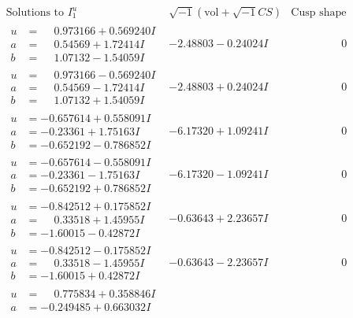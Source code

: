 \documentclass[1p]{elsarticle_modified}
\theoremstyle{definition}
\newcommand{\I}{\sqrt{-1}}
\begin{document}
$$\begin{array}{c|c|c}
\text{Solutions to }I^u_{1}& \I (\text{vol} + \sqrt{-1}CS) & \text{Cusp shape}\\
 \hline 
\begin{aligned}
u &= \phantom{-}0.973166 + 0.569240 I \\
a &= \phantom{-}0.54569 + 1.72414 I \\
b &= \phantom{-}1.07132 - 1.54059 I\end{aligned}
 & -2.48803 - 0.24024 I & \phantom{-0.000000 } 0 \\ \hline\begin{aligned}
u &= \phantom{-}0.973166 - 0.569240 I \\
a &= \phantom{-}0.54569 - 1.72414 I \\
b &= \phantom{-}1.07132 + 1.54059 I\end{aligned}
 & -2.48803 + 0.24024 I & \phantom{-0.000000 } 0 \\ \hline\begin{aligned}
u &= -0.657614 + 0.558091 I \\
a &= -0.23361 + 1.75163 I \\
b &= -0.652192 - 0.786852 I\end{aligned}
 & -6.17320 + 1.09241 I & \phantom{-0.000000 } 0 \\ \hline\begin{aligned}
u &= -0.657614 - 0.558091 I \\
a &= -0.23361 - 1.75163 I \\
b &= -0.652192 + 0.786852 I\end{aligned}
 & -6.17320 - 1.09241 I & \phantom{-0.000000 } 0 \\ \hline\begin{aligned}
u &= -0.842512 + 0.175852 I \\
a &= \phantom{-}0.33518 + 1.45955 I \\
b &= -1.60015 - 0.42872 I\end{aligned}
 & -0.63643 + 2.23657 I & \phantom{-0.000000 } 0 \\ \hline\begin{aligned}
u &= -0.842512 - 0.175852 I \\
a &= \phantom{-}0.33518 - 1.45955 I \\
b &= -1.60015 + 0.42872 I\end{aligned}
 & -0.63643 - 2.23657 I & \phantom{-0.000000 } 0 \\ \hline\begin{aligned}
u &= \phantom{-}0.775834 + 0.358846 I \\
a &= -0.249485 + 0.663032 I \\

\end{aligned}
\end{array}$$
\end{document}
